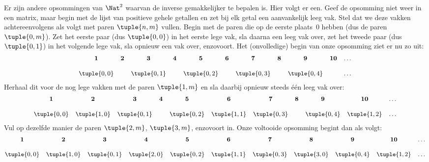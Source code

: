 \documentclass[../../../include/open-logic-section]{subfiles}
\begin{document}


\begin{explain}
Er zijn andere opsommingen van $\Nat^2$ waarvan de inverse gemakkelijker te
bepalen is. Hier volgt er een. Geef de opsomming niet weer in een matrix, maar
begin met de lijst van positieve gehele getallen en zet bij elk getal een
aanvankelijk leeg vak. Stel dat we deze vakken achtereenvolgens als volgt met
paren $\tuple{n,m}$ vullen. Begin met de paren die op de eerste plaats~$0$
hebben (dus de paren $\tuple{0,m}$). Zet het eerste paar (dus
$\tuple{0,0}$) in het eerste lege vak, sla daarna een leeg vak over, zet het
tweede paar (dus $\tuple{0,1}$) in het volgende lege vak, sla opnieuw een vak
over, enzovoort. Het (onvolledige) begin van onze opsomming ziet er nu zo uit:
\[\small
\begin{array}{@{}c c c c c c c c c c c@{}}
\mathbf 1 & \mathbf 2 & \mathbf 3 & \mathbf 4 & \mathbf 5 & \mathbf 6 & \mathbf 7 & \mathbf 8 & \mathbf 9 & \mathbf{10} & \dots \\ \\
\tuple{0,0} &  & \tuple{0,1} &  & \tuple{0,2} &  & \tuple{0,3} & & \tuple{0,4} &  & \dots \\
\end{array}
\]
Herhaal dit voor de nog lege vakken met de paren $\tuple{1,m}$ en sla daarbij
opnieuw steeds één leeg vak over:
\[\small
\begin{array}{@{}c c c c c c c c c c c@{}}
\mathbf 1 & \mathbf 2 & \mathbf 3 & \mathbf 4 & \mathbf 5 & \mathbf 6 & \mathbf 7 & \mathbf 8 & \mathbf 9 & \mathbf{10} & \dots \\ \\
\tuple{0,0} & \tuple{1,0} & \tuple{0,1} &  & \tuple{0,2} & \tuple{1,1} & 
\tuple{0,3} & & \tuple{0,4} &  \tuple{1,2} & \dots \\
\end{array}
\]
Vul op dezelfde manier de paren $\tuple{2,m}$, $\tuple{3,m}$, enzovoort in.
Onze voltooide opsomming begint dan als volgt:
\[\small
\begin{array}{@{}cc c c c c c c c c c@{}}
\mathbf 1 & \mathbf 2 & \mathbf 3 & \mathbf 4 & \mathbf 5 & \mathbf 6 & \mathbf 7 & \mathbf 8 & \mathbf 9 & \mathbf{10} & \dots \\ \\
\tuple{0,0} & \tuple{1,0} & \tuple{0,1} & \tuple{2,0}  & \tuple{0,2} & 
\tuple{1,1} & \tuple{0,3} & \tuple{3,0}  & \tuple{0,4} &  \tuple{1,2} & \dots \\

\end{array}\]
\end{explain}
\end{document}

